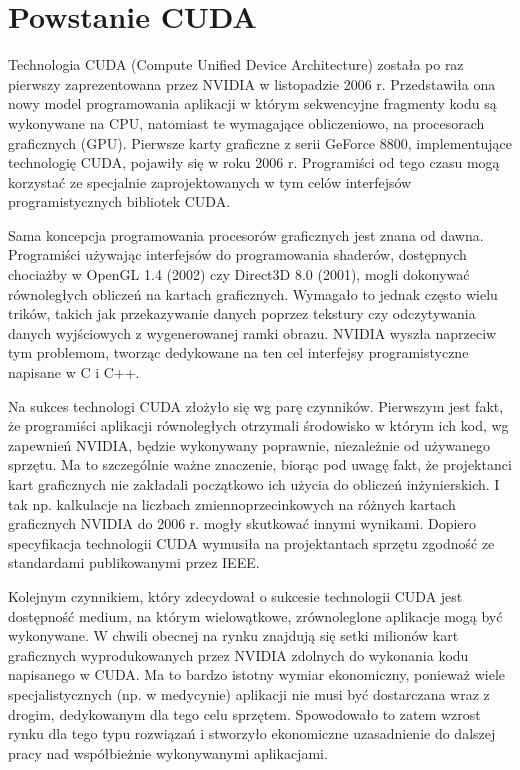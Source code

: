 \section{Powstanie CUDA}

Technologia CUDA (Compute Unified Device Architecture) została po raz pierwszy
zaprezentowana przez NVIDIA w listopadzie 2006 r. Przedstawiła ona nowy model
programowania aplikacji w którym sekwencyjne fragmenty kodu są wykonywane na
CPU, natomiast te wymagające obliczeniowo, na procesorach graficznych (GPU).
Pierwsze karty graficzne z serii GeForce 8800, implementujące technologię CUDA,
		 pojawiły się w roku 2006 r. Programiści od tego czasu mogą korzystać ze
		 specjalnie zaprojektowanych w tym celów interfejsów programistycznych
		 bibliotek CUDA.

Sama koncepcja programowania procesorów graficznych jest znana od dawna.
Programiści używając interfejsów do programowania shaderów, dostępnych chociażby
w OpenGL 1.4 (2002) czy Direct3D 8.0 (2001), mogli dokonywać równoległych
obliczeń na kartach graficznych. Wymagało to jednak często wielu trików, takich
jak przekazywanie danych poprzez tekstury czy odczytywania danych wyjściowych z
wygenerowanej ramki obrazu. NVIDIA wyszła naprzeciw tym problemom, tworząc
dedykowane na ten cel interfejsy programistyczne napisane w C i C++.

Na sukces technologi CUDA złożyło się wg \cite{massive} parę czynników.
Pierwszym jest fakt, że programiści aplikacji równoległych otrzymali środowisko
w którym ich kod, wg zapewnień NVIDIA, będzie wykonywany poprawnie, niezależnie
od używanego sprzętu. Ma to szczególnie ważne znaczenie, biorąc pod uwagę fakt,
   że projektanci kart graficznych nie zakładali początkowo ich użycia do
   obliczeń inżynierskich. I tak np. kalkulacje na liczbach zmiennoprzecinkowych
   na różnych kartach graficznych NVIDIA do 2006 r. mogły skutkować innymi
   wynikami. Dopiero specyfikacja technologii CUDA wymusiła na projektantach
   sprzętu zgodność ze standardami publikowanymi przez IEEE.

Kolejnym czynnikiem, który zdecydował o sukcesie technologii CUDA jest
dostępność medium, na którym wielowątkowe, zrównoleglone aplikacje mogą być
wykonywane. W chwili obecnej na rynku znajdują się setki milionów kart
graficznych wyprodukowanych przez NVIDIA zdolnych do wykonania kodu napisanego w
CUDA. Ma to bardzo istotny wymiar ekonomiczny, ponieważ wiele specjalistycznych
(np. w medycynie) aplikacji nie musi być dostarczana wraz z drogim,
	dedykowanym dla tego celu sprzętem. Spowodowało to zatem wzrost rynku dla
	tego typu rozwiązań i stworzyło ekonomiczne uzasadnienie do dalszej pracy
	nad współbieżnie wykonywanymi aplikacjami.


